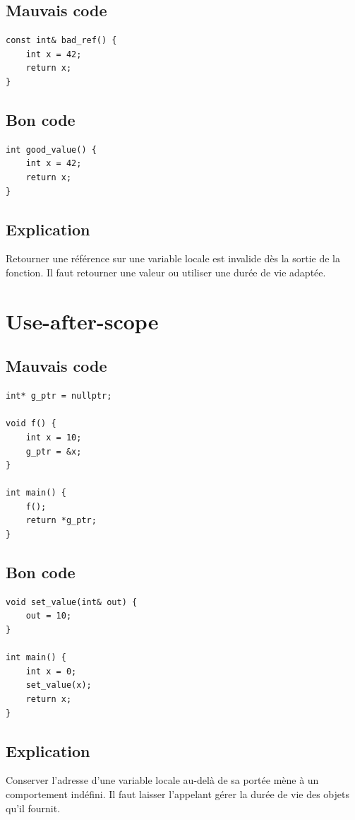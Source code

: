 \documentclass[a4paper,11pt]{report}
\begin{document}
\section{Mauvais code}
\begin{lstlisting}
const int& bad_ref() {
    int x = 42;
    return x;
}
\end{lstlisting}

\section{Bon code}
\begin{lstlisting}
int good_value() {
    int x = 42;
    return x;
}
\end{lstlisting}

\section{Explication}
Retourner une référence sur une variable locale est invalide dès la sortie de la fonction.
Il faut retourner une valeur ou utiliser une durée de vie adaptée.

\chapter{Use-after-scope}

\section{Mauvais code}
\begin{lstlisting}
int* g_ptr = nullptr;

void f() {
    int x = 10;
    g_ptr = &x;
}

int main() {
    f();
    return *g_ptr;
}
\end{lstlisting}

\section{Bon code}
\begin{lstlisting}
void set_value(int& out) {
    out = 10;
}

int main() {
    int x = 0;
    set_value(x);
    return x;
}
\end{lstlisting}

\section{Explication}
Conserver l'adresse d'une variable locale au-delà de sa portée mène à un comportement indéfini.
Il faut laisser l'appelant gérer la durée de vie des objets qu'il fournit.
\end{document}
